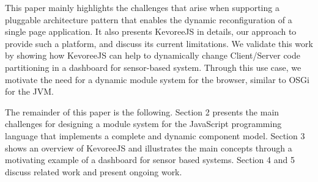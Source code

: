 This paper mainly highlights the challenges that arise when supporting a pluggable architecture pattern that enables the dynamic reconfiguration of a single page application. It also presents KevoreeJS in details, our approach to provide such a platform, and discuss its current limitations. We validate this work by showing how KevoreeJS can help to dynamically change Client/Server code partitioning in a dashboard for sensor-based system. Through this use case, we motivate the need for a dynamic module system for the browser, similar to OSGi for the JVM.  

The remainder of this paper is the following. Section 2 presents the main challenges for designing a module system for the JavaScript programming language that implements a complete and dynamic component model. Section 3 shows an overview of KevoreeJS and illustrates the main concepts through a motivating example of a dashboard for sensor based systems. Section 4 and 5 discuss related work and present ongoing work. 